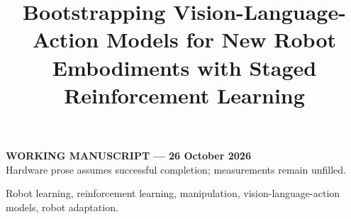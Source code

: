 \documentclass[letterpaper,journal]{IEEEtran}
\begin{document}
\title{Bootstrapping Vision-Language-Action Models for New Robot Embodiments with Staged Reinforcement Learning}
\author{\vspace{1em}}
\maketitle
\begin{center}\small\textbf{WORKING MANUSCRIPT --- 26 October 2026}\\
Hardware prose assumes successful completion; measurements remain unfilled.
\end{center}

\begin{IEEEkeywords}
Robot learning, reinforcement learning, manipulation, vision-language-action models, robot adaptation.
\end{IEEEkeywords}











\end{document}
